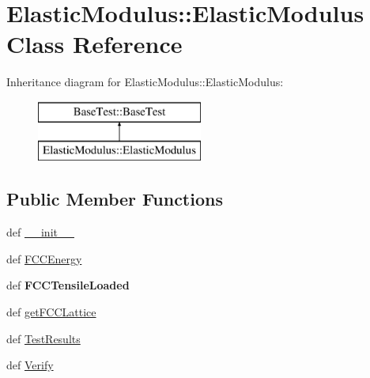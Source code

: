 \hypertarget{classElasticModulus_1_1ElasticModulus}{
\section{ElasticModulus::ElasticModulus Class Reference}
\label{classElasticModulus_1_1ElasticModulus}
}
Inheritance diagram for ElasticModulus::ElasticModulus:\begin{figure}[H]
\begin{center}
\leavevmode
\includegraphics[height=2.000000cm]{classElasticModulus_1_1ElasticModulus}
\end{center}
\end{figure}
\subsection*{Public Member Functions}
\begin{DoxyCompactItemize}
\item 
def \hyperlink{classElasticModulus_1_1ElasticModulus_a18b6cfda1e199e953e12ba4cabf2bd5f}{\_\-\_\-init\_\-\_\-}
\item 
def \hyperlink{classElasticModulus_1_1ElasticModulus_a3acdc220c6a2d32141e0e24e60539abf}{FCCEnergy}
\item 
\hypertarget{classElasticModulus_1_1ElasticModulus_a5873464a6af1ffb32de5783e7d0856fd}{
def {\bfseries FCCTensileLoaded}}
\label{classElasticModulus_1_1ElasticModulus_a5873464a6af1ffb32de5783e7d0856fd}

\item 
def \hyperlink{classElasticModulus_1_1ElasticModulus_ac813821bd5b1c17f90b019b7fc095d8f}{getFCCLattice}
\item 
def \hyperlink{classElasticModulus_1_1ElasticModulus_a7bef0cf173069a9bd267b7c034a9089e}{TestResults}
\item 
def \hyperlink{classElasticModulus_1_1ElasticModulus_af89210a8207272b806643fb55b5e9000}{Verify}
\end{DoxyCompactItemize}
